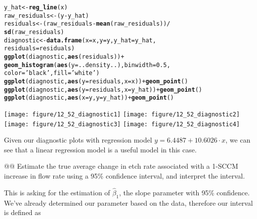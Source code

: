 \documentclass[10pt]{article}\usepackage[]{graphicx}\usepackage[]{xcolor}
\makeatletter
\newcommand{\hlnum}[1]{\textcolor[rgb]{0.686,0.059,0.569}{#1}}%
\newcommand{\hlstr}[1]{\textcolor[rgb]{0.192,0.494,0.8}{#1}}%
\newcommand{\hlopt}[1]{\textcolor[rgb]{0,0,0}{#1}}%
\newcommand{\hlstd}[1]{\textcolor[rgb]{0.345,0.345,0.345}{#1}}%
\newcommand{\hlkwb}[1]{\textcolor[rgb]{0.69,0.353,0.396}{#1}}%
\newcommand{\hlkwc}[1]{\textcolor[rgb]{0.333,0.667,0.333}{#1}}%
\newcommand{\hlkwd}[1]{\textcolor[rgb]{0.737,0.353,0.396}{\textbf{#1}}}%
\newenvironment{kframe}{%
 \def\at@end@of@kframe{}%
 \ifinner\ifhmode%
  \def\at@end@of@kframe{\end{minipage}}%
  \begin{minipage}{\columnwidth}%
 \fi\fi%
 \def\FrameCommand##1{\hskip\@totalleftmargin \hskip-\fboxsep
 \colorbox{shadecolor}{##1}\hskip-\fboxsep
     \hskip-\linewidth \hskip-\@totalleftmargin \hskip\columnwidth}%
 \MakeFramed {\advance\hsize-\width
   \@totalleftmargin\z@ \linewidth\hsize
   \@setminipage}}%
 {\par\unskip\endMakeFramed%
 \at@end@of@kframe}
\newenvironment{knitrout}{}{} %
\makeatother
\begin{document}
\begin{easylist}[enumerate]
\begin{knitrout}
\begin{kframe}
\begin{alltt}
         \hlstd{y_hat} \hlkwb{<-} \hlkwd{reg_line}\hlstd{(x)}
         \hlstd{raw_residuals} \hlkwb{<-} \hlstd{(y} \hlopt{-} \hlstd{y_hat)}
         \hlstd{residuals} \hlkwb{<-} \hlstd{(raw_residuals} \hlopt{-} \hlkwd{mean}\hlstd{(raw_residuals))} \hlopt{/}
                         \hlkwd{sd}\hlstd{(raw_residuals)}
         \hlstd{diagnostic} \hlkwb{<-} \hlkwd{data.frame}\hlstd{(}\hlkwc{x}\hlstd{=x,} \hlkwc{y}\hlstd{=y,} \hlkwc{y_hat}\hlstd{=y_hat,}
                                  \hlkwc{residuals}\hlstd{=residuals)}
         \hlkwd{ggplot}\hlstd{(diagnostic,} \hlkwd{aes}\hlstd{(residuals))} \hlopt{+}
             \hlkwd{geom_histogram}\hlstd{(}\hlkwd{aes}\hlstd{(}\hlkwc{y}\hlstd{=..density..),} \hlkwc{binwidth}\hlstd{=}\hlnum{0.5}\hlstd{,}
                            \hlkwc{color}\hlstd{=}\hlstr{'black'}\hlstd{,} \hlkwc{fill}\hlstd{=}\hlstr{'white'}\hlstd{)}
         \hlkwd{ggplot}\hlstd{(diagnostic,} \hlkwd{aes}\hlstd{(}\hlkwc{y}\hlstd{=residuals,} \hlkwc{x}\hlstd{=x))} \hlopt{+} \hlkwd{geom_point}\hlstd{()}
         \hlkwd{ggplot}\hlstd{(diagnostic,} \hlkwd{aes}\hlstd{(}\hlkwc{y}\hlstd{=residuals,} \hlkwc{x}\hlstd{=y_hat))} \hlopt{+} \hlkwd{geom_point}\hlstd{()}
         \hlkwd{ggplot}\hlstd{(diagnostic,} \hlkwd{aes}\hlstd{(}\hlkwc{x}\hlstd{=y,} \hlkwc{y}\hlstd{=y_hat))} \hlopt{+} \hlkwd{geom_point}\hlstd{()}
\end{alltt}
\end{kframe}

{\centering \texttt{[image: figure/12\_52\_diagnostic1]} 
\texttt{[image: figure/12\_52\_diagnostic2]} 
\texttt{[image: figure/12\_52\_diagnostic3]} 
\texttt{[image: figure/12\_52\_diagnostic4]} 

}



\end{knitrout}


    Given our diagnostic plots with regression model $y=6.4487 + 10.6026 \cdot x$, we can see that a linear
    regression model is a useful model in this case.

    @@ Estimate the true average change in etch rate associated with a 1-SCCM increase in flow rate using a 95\%
    confidence interval, and interpret the interval.\newline

    This is asking for the estimation of $\hat{\beta}_1$, the slope parameter with 95\% confidence. We've already
    determined our parameter based on the data, therefore our interval is defined as


\end{easylist}
\end{document}
